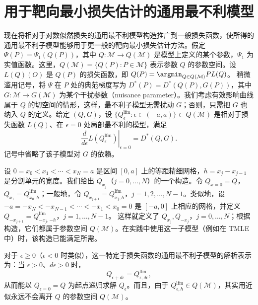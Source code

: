 \section{用于靶向最小损失估计的通用最不利模型}

现在将相对于对数似然损失的通用最不利模型构造推广到一般损失函数，使所得的通用最不利子模型能够用于更一般的靶向最小损失估计方法。假定 $\Psi(P)=\Psi_1(Q(P))$，其中 $Q:\mathcal M\to Q(\mathcal M)$ 是模型上定义的某个参数，$\Psi_1$ 为实值函数。这里，$Q(\mathcal M)=\{Q(P):P\in\mathcal M\}$ 表示参数 $Q$ 的参数空间。设 $L(Q)(O)$ 是 $Q(P)$ 的损失函数，即
$Q(P)=\argmin_{Q\in Q(\mathcal M)}PL(Q)$。
稍微滥用记号，将 $\Psi$ 在 $P$ 处的典范梯度写为
$D^*(P)=D^*(Q(P),G(P))$，其中 $G:\mathcal M\to G(\mathcal M)$ 为某个干扰参数（nuisance parameter）。我们考虑有效影响曲线属于 $Q$ 的切空间的情形，这样，最不利子模型无需扰动 $G$；否则，只需把 $G$ 也纳入 $Q$ 的定义。给定 $(Q,G)$，设
$\{Q_\epsilon^{\mathrm{lfm}}:\epsilon\in(-a,a)\}\subset Q(\mathcal M)$
是相对于损失函数 $L(Q)$、在 $\epsilon=0$ 处局部最不利的模型，满足
\[
 \left.\frac{d}{d\epsilon}L(Q_\epsilon^{\mathrm{lfm}})
 \right|_{\epsilon=0}=D^*(Q,G).
\]
记号中省略了该子模型对 $G$ 的依赖。

设 $0=x_0<x_1<\cdots<x_N=a$ 是区间 $[0,a]$ 上的等距精细网格，$h=x_j-x_{j-1}$ 是分割单元的宽度。我们给出 $Q_{x_j}$（$j=0,\ldots,N$）的一个构造。令 $Q_{x=0}=Q$，$Q_{x_1}=Q_{x_0,h}^{\mathrm{lfm}}$；一般地，令 $Q_{x_{j+1}}=Q_{x_j,h}^{\mathrm{lfm}}$，$j=1,2,\ldots,N-1$。类似地，设 $-a=-x_N<-x_{N-1}<\cdots<-x_1<x_0=0$ 是 $[-a,0]$ 上相应的网格，并定义
$Q_{-x_{j+1}}=Q_{-x_j,-h}^{\mathrm{lfm}}$，$j=1,\ldots,N-1$。
这样就定义了 $Q_{x_j},Q_{-x_j}$，$j=0,\ldots,N$；根据构造，它们都属于参数空间 $Q(\mathcal M)$。在实践中使用这一子模型（例如在 TMLE 中）时，该构造已能满足所需。

对于 $\epsilon\geq0$（$\epsilon<0$ 时类似），这一特定于损失函数的通用最不利子模型的解析表示为：当 $\epsilon>0$、$d\epsilon>0$ 时，
\begin{equation}
 Q_{\epsilon+d\epsilon}=Q_{\epsilon,d\epsilon}^{\mathrm{lfm}},
 \tag{5.3}
\end{equation}
从而能以 $Q_{\epsilon=0}=Q$ 为起点递归求解 $Q_\epsilon$。而且，由于
$Q_{\epsilon,h}^{\mathrm{lfm}}\in Q(\mathcal M)$，其实用近似永远不会离开 $Q$ 的参数空间 $Q(\mathcal M)$。

